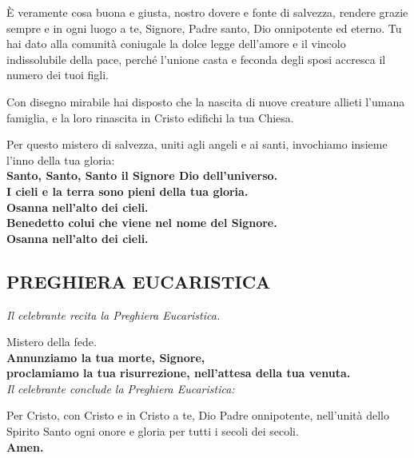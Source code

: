 \documentclass[10pt,b6paper,usenames,twoside]{article}
\begin{document}
\noindent \`{E} veramente cosa buona e giusta, nostro dovere e fonte di salvezza, rendere grazie sempre e in ogni luogo a te, Signore, Padre santo, Dio onnipotente ed eterno. 
\clearpage
\noindent Tu hai dato alla comunità coniugale la dolce legge dell'amore e il vincolo indissolubile della pace, perché l'unione casta e feconda degli sposi accresca il numero dei tuoi figli. 

\noindent Con disegno mirabile hai disposto che la nascita di nuove creature allieti l'umana famiglia, e la loro rinascita in Cristo edifichi la tua Chiesa. 

\noindent Per questo mistero di salvezza, uniti agli angeli e ai santi, invochiamo insieme l'inno della tua gloria:\\ 

\noindent \textbf{Santo, Santo, Santo il Signore Dio dell'universo.\\ I cieli e la terra sono pieni della tua gloria.\\ Osanna nell'alto dei cieli.\\ Benedetto colui che viene nel nome del Signore.\\ Osanna nell'alto dei cieli.} 

\subsection*{\textcolor{forestgreen(traditional)}{PREGHIERA EUCARISTICA}} 

\noindent \textcolor{forestgreen(traditional)}{\textit{\footnotesize{Il celebrante recita la Preghiera Eucaristica.}}}

\noindent Mistero della fede.\\ 
\noindent \textbf{Annunziamo la tua morte, Signore,\\ proclamiamo la tua risurrezione, nell'attesa della tua venuta.}\smallskip 
\\ 

\noindent \textcolor{forestgreen(traditional)}{\textit{\footnotesize{Il celebrante conclude la Preghiera Eucaristica:}}}

\noindent Per Cristo, con Cristo e in Cristo a te, Dio Padre onnipotente, nell'unità dello Spirito Santo ogni onore e gloria per tutti i secoli dei secoli.\\ 
\textbf{Amen.} 
\clearpage

\section*{\textcolor{forestgreen(traditional)}{}} 
\end{document}
